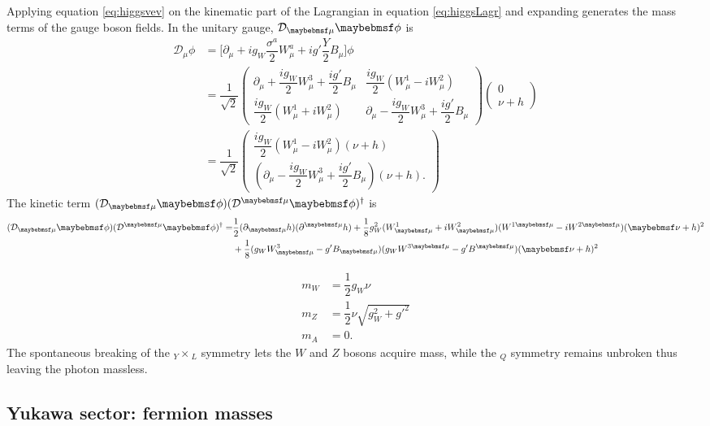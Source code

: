 Applying equation \ref{eq:higgsvev} on the kinematic part of the Lagrangian in equation \ref{eq:higgsLagr} and expanding generates the mass terms of the gauge boson fields. In the unitary gauge, $\covd_{\mu}\phi$ is
\begin{align}
    \mathcal{D}_{\mu}\phi & = \Big[\partial_{\mu}+ig_W\dfrac{\sigma^a}{2}W^a_{\mu}+ig'\dfrac{Y}{2}B_{\mu}\Big]\phi\\
        & = \dfrac{1}{\sqrt{2}}
        \begin{pmatrix}
             \partial_{\mu} + \dfrac{ig_W}{2}W_{\mu}^3 + \dfrac{ig'}{2}B_{\mu} & \dfrac{ig_W}{2}(W_{\mu}^1-iW_{\mu}^2) \\
             \dfrac{ig_W}{2}(W_{\mu}^1+iW_{\mu}^2) & \partial_{\mu} - \dfrac{ig_W}{2}W_{\mu}^3 + \dfrac{ig'}{2}B_{\mu}
        \end{pmatrix}
        \begin{pmatrix}
             0 \\
             \nu+h
        \end{pmatrix}\\
        & = \dfrac{1}{\sqrt{2}}
        \begin{pmatrix}
             \dfrac{ig_W}{2}(W_{\mu}^1-iW_{\mu}^2)(\nu+h)\\
             (\partial_{\mu}-\dfrac{ig_W}{2}W_{\mu}^3+\dfrac{ig'}{2}B_{\mu})(\nu+h).
        \end{pmatrix}
\end{align}
The kinetic term $(\covd_{\mu}\phi)(\covd^{\mu}\phi)^{\dagger}$ is
\begin{align}
    (\covd_{\mu}\phi)(\covd^{\mu}\phi)^{\dagger} = &  \dfrac{1}{2}(\partial_{\mu}h)(\partial^{\mu}h) + \dfrac{1}{8}g_ W^2(W_{\mu}^1+iW_{\mu}^2)(W^{1\mu}-iW^{2\mu})(\nu+h)^2\\
    & + \dfrac{1}{8}(g_W W_{\mu}^3 - g'B_{\mu})(g_W W^{3\mu} - g'B^{\mu})(\nu+h)^2
\end{align}

\begin{align}
    m_W & =\dfrac{1}{2}g_{W}\nu\\
    m_Z & =\dfrac{1}{2}\nu\sqrt{g_W^2+g'^2}\\
    m_A & =0.
\end{align}
The spontaneous breaking of the $_Y\times$$_{L}$ symmetry lets the $W$ and $Z$ bosons acquire mass, while the $_Q$ symmetry remains unbroken thus leaving the photon massless. 

\subsection{Yukawa sector: fermion masses}

